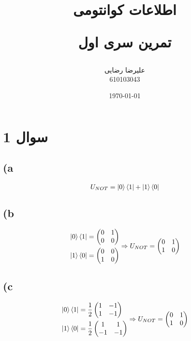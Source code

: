 \documentclass{article}
\title{
    اطلاعات کوانتومی
    
    تمرین سری اول 
}
\author{
    علیرضا رضایی
    \\
    610103043
}
\date{
    \today
}
\begin{document}
\maketitle

\section*{
 سوال 1   
}

\subsection*{(a}
\begin{align*}
U_{NOT} = \ket{0}\bra{1} + \ket{1}\bra{0}
\end{align*}

\subsection*{(b}
\begin{align*}
    \begin{aligned}        
        &\ket{0}\bra{1} =\begin{pmatrix}
            0 & 1\\
            0 & 0
        \end{pmatrix}\\
        &\ket{1}\bra{0} = \begin{pmatrix}
            0 & 0\\
            1 & 0
        \end{pmatrix}
    \end{aligned}
    \Rightarrow U_{NOT} = \begin{pmatrix}
        0 & 1\\
        1 & 0
    \end{pmatrix}
\end{align*}

\subsection*{(c}
\begin{align*}
    \begin{aligned}        
        &\ket{0}\bra{1} = \frac{1}{2}\begin{pmatrix}
            1 & -1\\
            1 & -1
        \end{pmatrix}\\
        &\ket{1}\bra{0} = \frac{1}{2}\begin{pmatrix}
            1 & 1\\
            -1 & -1
        \end{pmatrix}
    \end{aligned}
    \Rightarrow U_{NOT} = \begin{pmatrix}
        0 & 1\\
        1 & 0
    \end{pmatrix}
\end{align*}
\end{document}
